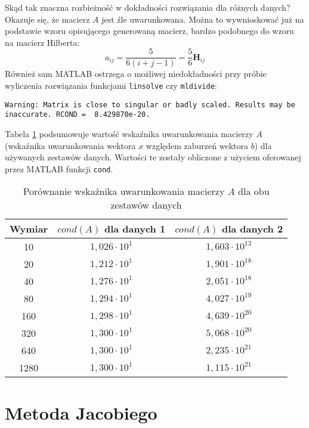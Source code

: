 \documentclass[12pt]{article}
\begin{document}
Skąd tak znaczna rozbieżność w dokładności rozwiązania dla różnych danych? Okazuje się, że macierz \(A\) jest źle uwarunkowana. Można to wywnioskować już na podstawie wzoru opisującego generowaną macierz, bardzo podobnego do wzoru na macierz Hilberta:
\[ a_{ij} = \frac{5}{6(i+j-1)} = \frac{5}{6} \mathbf{H}_{ij} \]
Również sam MATLAB ostrzega o możliwej niedokładności przy próbie wyliczenia rozwiązania funkcjami \texttt{linsolve} czy \texttt{mldivide}:
\begin{verbatim}
Warning: Matrix is close to singular or badly scaled. Results may be inaccurate. RCOND =  8.429870e-20.
\end{verbatim}

Tabela \ref{table:condition} podsumowuje wartość wskaźnika uwarunkowania macierzy \(A\) (wskaźnika uwarunkowania wektora \(x\) względem zaburzeń wektora \(b\)) dla używanych zestawów danych. Wartości te zostały obliczone z użyciem oferowanej przez MATLAB funkcji \texttt{cond}.

\begin{table}[!htbp]
\centering
\begin{tabular}{|c|c|c|} 
    \hline
    \textbf{Wymiar} & \textbf{\(cond(A)\) dla danych 1} & \textbf{\(cond(A)\) dla danych 2} \\
    \hline\hline
    10   & \(1,026\cdot10^{1}\) & \(1,603\cdot10^{13}\) \\ \hline
    20   & \(1,212\cdot10^{1}\) & \(1,901\cdot10^{18}\) \\ \hline
    40   & \(1,276\cdot10^{1}\) & \(2,051\cdot10^{18}\) \\ \hline
    80   & \(1,294\cdot10^{1}\) & \(4,027\cdot10^{19}\) \\ \hline
    160  & \(1,298\cdot10^{1}\) & \(4,639\cdot10^{20}\) \\ \hline
    320  & \(1,300\cdot10^{1}\) & \(5,068\cdot10^{20}\) \\ \hline
    640  & \(1,300\cdot10^{1}\) & \(2,235\cdot10^{21}\) \\ \hline
    1280 & \(1,300\cdot10^{1}\) & \(1,115\cdot10^{21}\) \\ \hline
\end{tabular}
\caption{Porównanie wskaźnika uwarunkowania macierzy \(A\) dla obu zestawów danych}
\label{table:condition}
\end{table}
\FloatBarrier

\clearpage
\section{Metoda Jacobiego}
\end{document}
